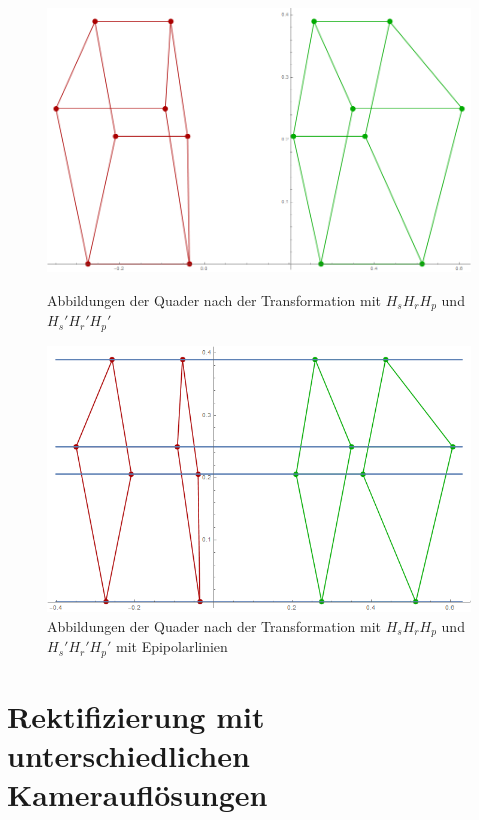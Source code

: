 \begin{figure}[!htb]
	\includegraphics[width=\linewidth]{images/Rectification_HsHrHp_same_Solutions.png}
	\caption[Transformationen $H_sH_rH_p$ und $H_s'H_r'H_p'$ ]{Abbildungen der Quader nach der Transformation mit $H_sH_rH_p$ und $H_s'H_r'H_p'$}
	\label{fig:RectSameHsHrHp1}
	\endminipage\hfill
	\includegraphics[width=\linewidth]{images/Rectification_HsHrHp_same_Solutions_Lines.png}
	\caption[Tranformationen $H_sH_rH_p$ und $H_s'H_r'H_p'$ mit Epipolarlinien]{Abbildungen der Quader nach der Transformation mit $H_sH_rH_p$ und $H_s'H_r'H_p'$ mit Epipolarlinien}
	\label{fig:RectSameHsHrHp2}
	\endminipage\hfill
\end{figure}

\section{Rektifizierung mit unterschiedlichen Kamerauflösungen}


